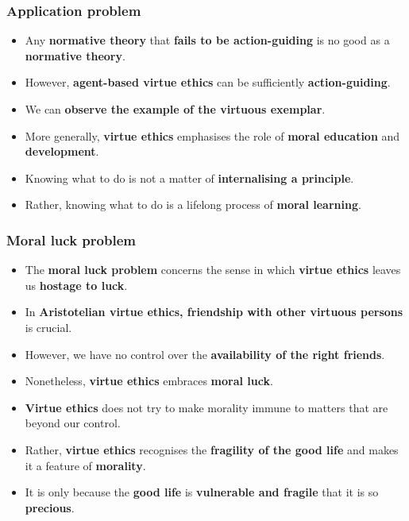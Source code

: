 \documentclass[11pt]{article}
\begin{document}
\subsubsection{Application problem}
\label{sec:org1948a9c}
\begin{itemize}
\item Any \textbf{normative theory} that \textbf{fails to be action-guiding} is no good as a \textbf{normative theory}.
\item However, \textbf{agent-based virtue ethics} can be sufficiently \textbf{action-guiding}.
\item We can \textbf{observe the example of the virtuous exemplar}.
\item More generally, \textbf{virtue ethics} emphasises the role of \textbf{moral education} and \textbf{development}.
\item Knowing what to do is not a matter of \textbf{internalising a principle}.
\item Rather, knowing what to do is a lifelong process of \textbf{moral learning}.
\end{itemize}
\subsubsection{Moral luck problem}
\label{sec:orge69c7a2}
\begin{itemize}
\item The \textbf{moral luck problem} concerns the sense in which \textbf{virtue ethics} leaves us \textbf{hostage to luck}.
\item In \textbf{Aristotelian virtue ethics, friendship with other virtuous persons} is crucial.
\item However, we have no control over the \textbf{availability of the right friends}.
\item Nonetheless, \textbf{virtue ethics} embraces \textbf{moral luck}.
\item \textbf{Virtue ethics} does not try to make morality immune to matters that are beyond our control.
\item Rather, \textbf{virtue ethics} recognises the \textbf{fragility of the good life} and makes it a feature of \textbf{morality}.
\item It is only because the \textbf{good life} is \textbf{vulnerable and fragile} that it is so \textbf{precious}.
\end{itemize}

 \newpage
\end{document}

